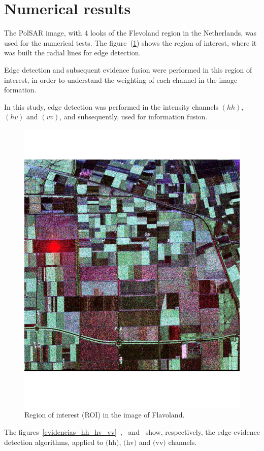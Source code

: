 \documentclass[conference]{IEEEtran}
\begin{document}
\section{Numerical results}\label{sec_08}
The PolSAR image, with 4 looks of the Flevoland region in the Netherlands, was used for the numerical tests. The figure~(\ref{flevoland_radial_4look}) shows the region of interest, where it was built the radial lines for edge detection.

 Edge detection and subsequent evidence fusion were performed in this region of interest, in order to understand the weighting of each channel in the image formation.

In this study, edge detection was performed in the intensity channels $(hh)$, $(hv)$ and $(vv)$, and subsequently, used for information fusion. 
\begin{figure}[hbt]
\centering
	\includegraphics[scale=0.3]{flevoland_radial_4_look.pdf}
			\vspace{-1.0cm}
	\caption{Region of interest (ROI) in the image of Flavoland.}
\label{flevoland_radial_4look}
\end{figure}
The figures~\ref{evidencias_hh_hv_vv}~,~ and~ show, respectively, the edge evidence detection algorithms, applied to $\text{(hh)}$, $\text{(hv)}$ and $\text{(vv)}$ channels. 
\end{document}
